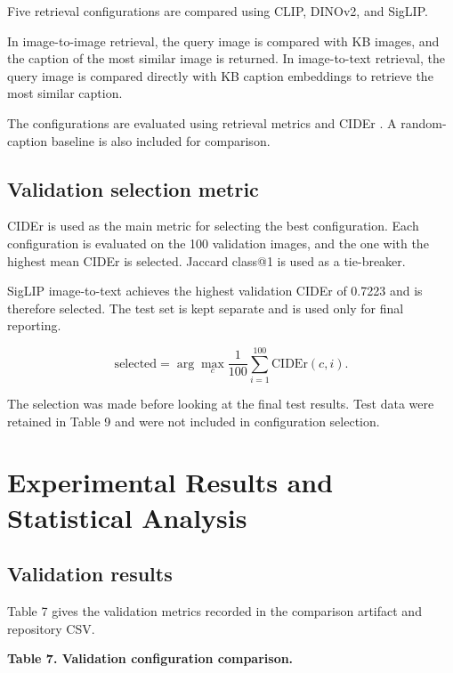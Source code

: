 \documentclass{article}
\begin{document}
Five retrieval configurations are compared using CLIP, DINOv2,
and SigLIP.

In image-to-image retrieval, the query image is compared with KB
images, and the caption of the most similar image is returned.
In image-to-text retrieval, the query image is compared directly
with KB caption embeddings to retrieve the most similar caption.

The configurations are evaluated using retrieval metrics and CIDEr \cite{vedantam_cider_2015}.
A random-caption baseline is also included for comparison.

\subsection{Validation selection
metric}\label{validation-selection-metric}

CIDEr \cite{vedantam_cider_2015} is used as the main metric for selecting the best
configuration. Each configuration is evaluated on the 100
validation images, and the one with the highest mean CIDEr is
selected. Jaccard class@1 is used as a tie-breaker.

SigLIP image-to-text achieves the highest validation CIDEr of
0.7223 and is therefore selected. The test set is kept separate
and is used only for final reporting.


\[
\text{selected} = \arg\max_c
\frac{1}{100}\sum_{i=1}^{100}\mathrm{CIDEr}(c,i).
\]

The selection was made before looking at the final test results. Test
data were retained in Table 9 and were not included in
configuration selection.

\section{Experimental Results and Statistical
Analysis}\label{experimental-results-and-statistical-analysis}

\subsection{Validation results}\label{validation-results}

Table 7 gives the validation metrics
recorded in the comparison artifact and repository CSV.

\begin{center}
\textbf{Table 7. Validation configuration comparison.}
\end{center}
\end{document}

